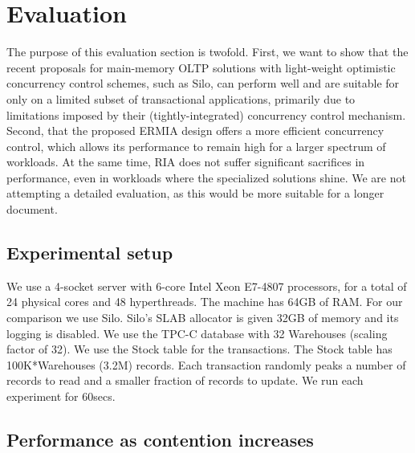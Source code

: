 
\section{Evaluation}

The purpose of this evaluation section is twofold.  First, we want to show that the recent proposals for main-memory OLTP solutions with light-weight optimistic concurrency control schemes, such as Silo, can perform well and are suitable for only on a limited subset of transactional applications, primarily due to limitations imposed by their (tightly-integrated) concurrency control mechanism.  Second, that the proposed ERMIA design offers a more efficient concurrency control, which allows its performance to remain high for a larger spectrum of workloads.  At the same time, RIA does not suffer significant sacrifices in performance, even in workloads where the specialized solutions shine.  We are not attempting a detailed evaluation, as this would be more suitable for a longer document.

\subsection{Experimental setup}

We use a 4-socket server with 6-core Intel Xeon E7-4807 processors, for a total of 24 physical cores and 48 hyperthreads. The machine has 64GB of RAM. 
For our comparison we use Silo.  Silo's SLAB allocator is given 32GB of memory and its logging is disabled. We use the TPC-C database with 32 Warehouses (scaling factor of 32). We use the Stock table for the transactions.  The Stock table has 100K*Warehouses (3.2M) records. Each transaction randomly peaks a number of records to read and a smaller fraction of records to update.  We run each experiment for 60secs.



\subsection{Performance as contention increases}

